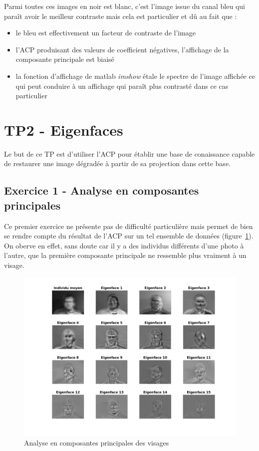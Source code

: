\documentclass{article}
\begin{document}
Parmi toutes ces images en noir est blanc, c'est l'image issue du canal bleu qui paraît avoir le meilleur contraste mais cela est particulier et dû au fait que :
\begin{itemize}
	\item le bleu est effectivement un facteur de contraste de l'image
	\item l'ACP produisant des valeurs de coefficient négatives, l'affichage de la composante principale est biaisé
	\item la fonction d'affichage de matlab \emph{imshow} étale le spectre de l'image affichée ce qui peut conduire à un affichage qui paraît plus contrasté dans ce cas particulier
\end{itemize}
\section{TP2 - Eigenfaces}
Le but de ce TP est d'utiliser l'ACP pour établir une base de conaissance capable de restaurer une image dégradée à partir de sa projection dans cette base.
\subsection{Exercice 1 - Analyse en composantes principales}
Ce premier exercice ne présente pas de difficulté particulière mais permet de bien se rendre compte  du résultat de l'ACP sur un tel ensemble de données (figure~\ref{acp_faces}). On oberve en effet, sans doute car il y a des individus différents d'une photo à l'autre, que la première composante principale ne ressemble plus vraiment à un visage.
\begin{figure}[ht]
    \begin{center}
        \includegraphics[width=0.9\linewidth]{images/2/2_1_res.png}
        \caption{Analyse en composantes principales des visages}
        \label{acp_faces}
    \end{center}
\end{figure}
\end{document}

